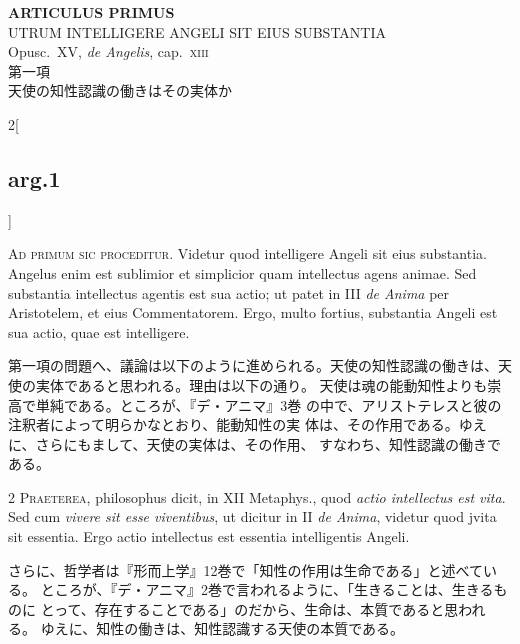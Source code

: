 \documentclass[paper=a4paper,fontsize=10pt,jafontsize=9pt,titlepage]{jlreq}
\begin{document}
\begin{center}
 {\Large {\bfseries ARTICULUS PRIMUS}}\\
 {\large UTRUM INTELLIGERE ANGELI SIT EIUS SUBSTANTIA}\\
 {\footnotesize Opusc.~XV, {\itshape de Angelis}, cap.~{\scshape xiii}}\\
 {\Large 第一項\\天使の知性認識の働きはその実体か}
\end{center}

\begin{paracol}{2}[\subsection{arg.1}]

{\huge A}{\scshape d primum sic proceditur}. Videtur quod intelligere
Angeli sit eius substantia. Angelus enim est sublimior et simplicior
quam intellectus agens animae. Sed substantia intellectus agentis est
sua actio; ut patet in III {\itshape de Anima} per Aristotelem, et eius
Commentatorem. Ergo, multo fortius, substantia Angeli est sua actio,
quae est intelligere.

\switchcolumn

第一項の問題へ、議論は以下のように進められる。天使の知性認識の働きは、天
使の実体であると思われる。理由は以下の通り。
天使は魂の能動知性よりも崇高で単純である。ところが、『デ・アニマ』3巻
 の中で、アリストテレスと彼の注釈者によって明らかなとおり、能動知性の実
 体は、その作用である。ゆえに、さらにもまして、天使の実体は、その作用、
 すなわち、知性認識の働きである。


{\scshape  2 Praeterea}, philosophus dicit, in XII Metaphys., quod {\itshape actio
 intellectus est vita}. Sed cum {\itshape vivere sit esse viventibus}, ut dicitur in
 II {\itshape de Anima}, videtur quod jvita sit essentia. Ergo actio intellectus est
 essentia intelligentis Angeli.

\switchcolumn

さらに、哲学者は『形而上学』12巻で「知性の作用は生命である」と述べている。
 ところが、『デ・アニマ』2巻で言われるように、「生きることは、生きるものに
 とって、存在することである」のだから、生命は、本質であると思われる。
ゆえに、知性の働きは、知性認識する天使の本質である。


\end{paracol}
\end{document}
